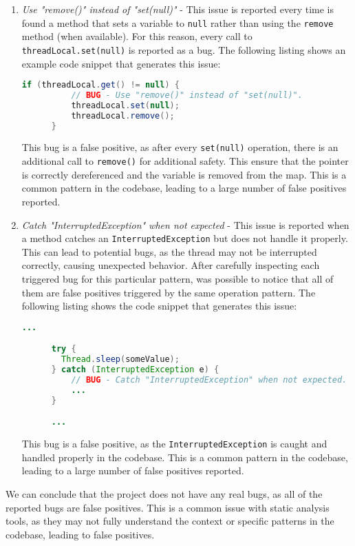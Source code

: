 \begin{enumerate}
  \item \textit{Use "remove()" instead of "set(null)"} - This issue is reported every time is found a method that sets a variable to \texttt{null} rather than using the \texttt{remove} method (when available). For this reason, every call to \texttt{threadLocal.set(null)} is reported as a bug. The following listing shows an example code snippet that generates this issue:

    \begin{lstlisting}[language=Java]
      if (threadLocal.get() != null) {
          // BUG - Use "remove()" instead of "set(null)".
          threadLocal.set(null);
          threadLocal.remove();
      }
    \end{lstlisting}

    \noindent This bug is a false positive, as after every \texttt{set(null)} operation, there is an additional call to \texttt{remove()} for additional safety. This ensure that the pointer is correctly dereferenced and the variable is removed from the map. This is a common pattern in the codebase, leading to a large number of false positives reported.

  \item \textit{Catch "InterruptedException" when not expected} - This issue is reported when a method catches an \texttt{InterruptedException} but does not handle it properly. This can lead to potential bugs, as the thread may not be interrupted correctly, causing unexpected behavior. After carefully inspecting each triggered bug for this particular pattern, was possible to notice that all of them are false positives triggered by the same operation pattern. The following listing shows the code snippet that generates this issue:
    \begin{lstlisting}[language=Java]
      ...

      try {
        Thread.sleep(someValue);
      } catch (InterruptedException e) {
          // BUG - Catch "InterruptedException" when not expected.
          ...
      }

      ...
    \end{lstlisting}
    \noindent This bug is a false positive, as the \texttt{InterruptedException} is caught and handled properly in the codebase. This is a common pattern in the codebase, leading to a large number of false positives reported.
\end{enumerate}

\noindent We can conclude that the project does not have any real bugs, as all of the reported bugs are false positives. This is a common issue with static analysis tools, as they may not fully understand the context or specific patterns in the codebase, leading to false positives.

